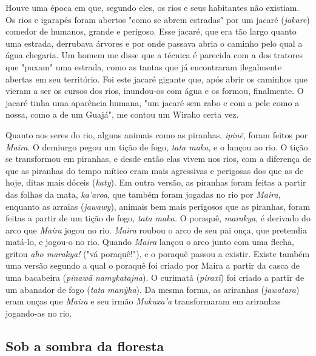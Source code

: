 Houve uma época em que, segundo eles, os rios e seus habitantes não
existiam. Os rios e igarapés foram abertos "como se abrem estradas" por
um jacaré (\emph{jakare}) comedor de humanos, grande e perigoso. Esse
jacaré, que era tão largo quanto uma estrada, derrubava árvores e por
onde passava abria o caminho pelo qual a água chegaria. Um homem me
disse que a técnica é parecida com a dos tratores que "puxam" uma
estrada, como as tantas que já encontraram ilegalmente abertas em seu
território. Foi este jacaré gigante que, após abrir os caminhos que
vieram a ser os cursos dos rios, inundou-os com água e os formou,
finalmente. O jacaré tinha uma aparência humana, "um jacaré sem rabo e
com a pele como a nossa, como a de um Guajá", me contou um Wiraho certa
vez.

Quanto aos seres do rio, alguns animais como as piranhas, \emph{ipinẽ},
foram feitos por \emph{Maira}. O demiurgo pegou um tição de fogo,
\emph{tata maka}, e o lançou ao rio. O tição se transformou em piranhas,
e desde então elas vivem nos rios, com a diferença de que as piranhas do
tempo mítico eram mais agressivas e perigosas dos que as de hoje, ditas
mais dóceis (\emph{katy}). Em outra versão, as piranhas foram feitas a
partir das folhas da mata, \emph{ka'aroa}, que também foram jogadas no
rio por \emph{Maira}, enquanto as arraias (\emph{jawawy}), animais bem
mais perigosos que as piranhas, foram feitas a partir de um tição de
fogo, \emph{tata maka.} O poraquê, \emph{marakya}, é derivado do arco
que \emph{Maira} jogou no rio. \emph{Maira} roubou o arco de seu pai
onça, que pretendia matá-lo, e jogou-o no rio. Quando \emph{Maira}
lançou o arco junto com uma flecha, gritou \emph{aho marakya!} ("vá
poraquê!"), e o poraquê passou a existir. Existe também uma versão
segundo a qual o poraquê foi criado por Maira a partir da casca de uma
bacabeira (\emph{pinawã namykatajna}). O curimatá (\emph{piraxĩ}) foi
criado a partir de um abanador de fogo (\emph{tata} \emph{manỹha}). Da
mesma forma, as ariranhas (\emph{jawatara}) eram onças que \emph{Maira}
e seu irmão \emph{Mukuxa'a} transformaram em ariranhas jogando-as no
rio.

\hypertarget{section}{%
\subsection{}\label{section}}

\hypertarget{sob-a-sombra-da-floresta}{%
\subsection{Sob a sombra da floresta }\label{sob-a-sombra-da-floresta}}

